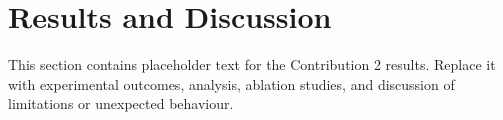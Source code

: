 \section{Results and Discussion}
\label{sec::contrib2::results}

This section contains placeholder text for the Contribution 2 results. Replace it with experimental outcomes, analysis, ablation studies, and discussion of limitations or unexpected behaviour.
